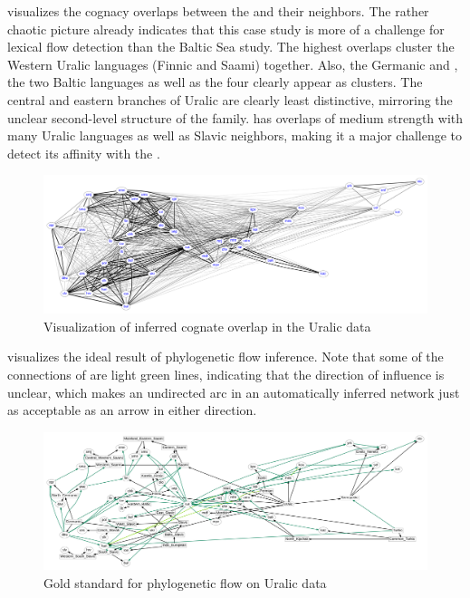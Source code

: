  visualizes the cognacy overlaps between the  and their neighbors. The rather chaotic picture already indicates that this case study is more of a challenge for lexical flow detection than the Baltic Sea study. The highest overlaps cluster the Western Uralic languages (Finnic and Saami) together. Also, the Germanic and , the two Baltic languages as well as the four  clearly appear as clusters. The central and eastern branches of Uralic are clearly least distinctive, mirroring the unclear second-level structure of the family.  has overlaps of medium strength with many Uralic languages as well as Slavic neighbors, making it a major challenge to detect its affinity with the .

\begin{figure}
 \includegraphics[width=\textwidth]{figures/cognacy-strength-uralic.pdf}
 \caption{Visualization of inferred cognate overlap in the Uralic data}
 \label{uralic-cognacy}
\end{figure}

 visualizes the ideal result of phylogenetic flow inference. Note that some of the connections of  are light green lines, indicating that the direction of influence is unclear, which makes an undirected arc in an automatically inferred network just as acceptable as an arrow in either direction.

\begin{figure}
 \includegraphics[width=\textwidth]{figures/goldstandard-phylo-uralic.pdf}
 \caption{Gold standard for phylogenetic flow on Uralic data}
 \label{uralic-goldstandard-phylo}
\end{figure}

